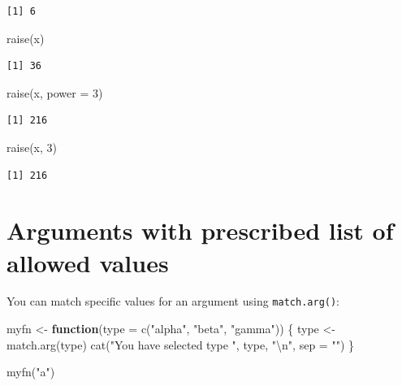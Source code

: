 \documentclass[
]{book}
\newenvironment{Shaded}{\begin{snugshade}}{\end{snugshade}}
\newcommand{\AttributeTok}[1]{\textcolor[rgb]{0.77,0.63,0.00}{#1}}
\newcommand{\ControlFlowTok}[1]{\textcolor[rgb]{0.13,0.29,0.53}{\textbf{#1}}}
\newcommand{\DecValTok}[1]{\textcolor[rgb]{0.00,0.00,0.81}{#1}}
\newcommand{\FunctionTok}[1]{\textcolor[rgb]{0.00,0.00,0.00}{#1}}
\newcommand{\NormalTok}[1]{#1}
\newcommand{\OtherTok}[1]{\textcolor[rgb]{0.56,0.35,0.01}{#1}}
\newcommand{\SpecialCharTok}[1]{\textcolor[rgb]{0.00,0.00,0.00}{#1}}
\newcommand{\StringTok}[1]{\textcolor[rgb]{0.31,0.60,0.02}{#1}}
\begin{document}
\begin{verbatim}
[1] 6
\end{verbatim}

\begin{Shaded}
\begin{Highlighting}[]
\FunctionTok{raise}\NormalTok{(x)}
\end{Highlighting}
\end{Shaded}

\begin{verbatim}
[1] 36
\end{verbatim}

\begin{Shaded}
\begin{Highlighting}[]
\FunctionTok{raise}\NormalTok{(x, }\AttributeTok{power =} \DecValTok{3}\NormalTok{)}
\end{Highlighting}
\end{Shaded}

\begin{verbatim}
[1] 216
\end{verbatim}

\begin{Shaded}
\begin{Highlighting}[]
\FunctionTok{raise}\NormalTok{(x, }\DecValTok{3}\NormalTok{)}
\end{Highlighting}
\end{Shaded}

\begin{verbatim}
[1] 216
\end{verbatim}

\hypertarget{arguments-with-prescribed-list-of-allowed-values}{%
\section{Arguments with prescribed list of allowed values}\label{arguments-with-prescribed-list-of-allowed-values}}

You can match specific values for an argument using \texttt{match.arg()}:

\begin{Shaded}
\begin{Highlighting}[]
\NormalTok{myfn }\OtherTok{\textless{}{-}} \ControlFlowTok{function}\NormalTok{(}\AttributeTok{type =} \FunctionTok{c}\NormalTok{(}\StringTok{"alpha"}\NormalTok{, }\StringTok{"beta"}\NormalTok{, }\StringTok{"gamma"}\NormalTok{)) \{}
\NormalTok{  type }\OtherTok{\textless{}{-}} \FunctionTok{match.arg}\NormalTok{(type)}
  \FunctionTok{cat}\NormalTok{(}\StringTok{"You have selected type \textquotesingle{}"}\NormalTok{, type, }\StringTok{"\textquotesingle{}}\SpecialCharTok{\textbackslash{}n}\StringTok{"}\NormalTok{, }\AttributeTok{sep =} \StringTok{""}\NormalTok{)}
\NormalTok{\}}

\FunctionTok{myfn}\NormalTok{(}\StringTok{"a"}\NormalTok{)}
\end{Highlighting}
\end{Shaded}
\end{document}
